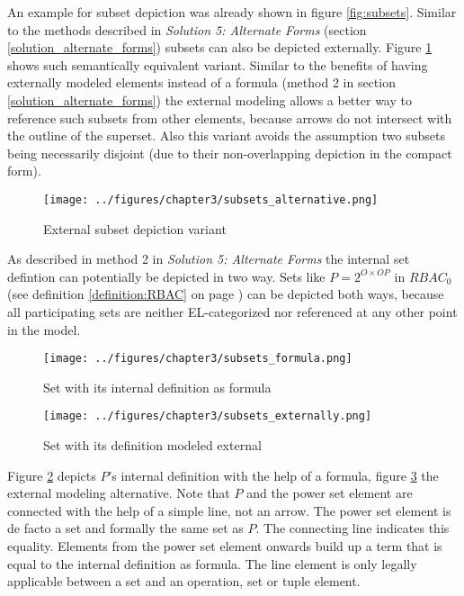 \documentclass[twoside, openright, 12pt]{book}
\begin{document}
An example for subset depiction was already shown in figure \ref{fig:subsets}.
Similar to the methods described in \textit{Solution 5: Alternate Forms} (section \ref{solution_alternate_forms}) subsets can also be depicted externally.
Figure \ref{fig:subsets_alternative} shows such semantically equivalent variant.
Similar to the benefits of having externally modeled elements instead of a formula (method 2 in section \ref{solution_alternate_forms}) the external modeling allows a better way to reference such subsets from other elements, because arrows do not intersect with the outline of the superset.
Also this variant avoids the assumption two subsets being necessarily disjoint (due to their non-overlapping depiction in the compact form).

\begin{figure}[htb]
	\centering
	\texttt{[image: ../figures/chapter3/subsets\_alternative.png]}
	\caption{External subset depiction variant}
	\label{fig:subsets_alternative}
\end{figure}

\noindent
As described in method 2 in \textit{Solution 5: Alternate Forms} the internal set defintion can potentially be depicted in two way.
Sets like $P = 2^{O \times OP}$ in $RBAC_0$ (see definition \ref{definition:RBAC} on page \pageref{definition:RBAC}) can be depicted both ways, because all participating sets are neither EL-categorized nor referenced at any other point in the model.

\begin{figure}[htb]
	\centering
	\texttt{[image: ../figures/chapter3/subsets\_formula.png]}
	\caption{Set with its internal definition as formula}
	\label{fig:subsets_formula}
\end{figure}

\begin{figure}[htb]
	\centering
	\texttt{[image: ../figures/chapter3/subsets\_externally.png]}
	\caption{Set with its definition modeled external}
	\label{fig:subsets_externally}
\end{figure}

\noindent
Figure \ref{fig:subsets_formula} depicts $P$'s internal definition with the help of a formula, figure \ref{fig:subsets_externally} the external modeling alternative.
Note that $P$ and the power set element are connected with the help of a simple line, not an arrow.
The power set element is de facto a set and formally the same set as $P$.
The connecting line indicates this equality.
Elements from the power set element onwards build up a term that is equal to the internal definition as formula.
The line element is only legally applicable between a set and an operation, set or tuple element.
\end{document}
